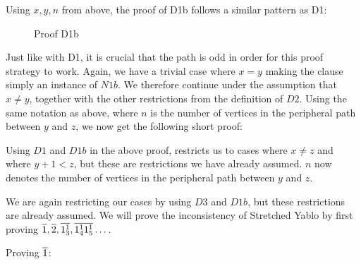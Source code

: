 Using $x,y,n$ from above, the proof of D1b follows a similar pattern as D1:\par
\begin{figure}[!h]
  \centering
  \begin{prooftree*}
  \end{prooftree*}
  \caption{Proof D1b}
  \label{fig:proof_d1b}
\end{figure}
Just like with D1, it is crucial that the path is odd in order for this proof strategy to work.
Again, we have a trivial case where $x = y$ making the clause simply an instance of $N1b$.
We therefore continue under the assumption that $x \neq y$, together with the other restrictions from the definition of $D2$.
Using the same notation as above, where $n$ is the number of vertices in the peripheral path between $y$ and $z$, we now get the following short proof:
\begin{prooftree*}
\end{prooftree*}
Using $D1$ and $D1b$ in the above proof, restricts us to cases where $x \neq z$ and where $y+1 < z$, but these are restrictions we have already assumed.
$n$ now denotes the number of vertices in the peripheral path between $y$ and $z$.
\begin{prooftree*}
\end{prooftree*}
We are again restricting our cases by using $D3$ and $D1b$, but these restrictions are already assumed.
We will prove the inconsistency of Stretched Yablo by first proving $\ol{1},\ol{2},\ol{1^1_3},\ol{1^1_4}\ol{1^1_5}\dots$.

Proving $\ol{1}$:
\begin{prooftree*}
  \Hypo{\dots}
\end{prooftree*}

